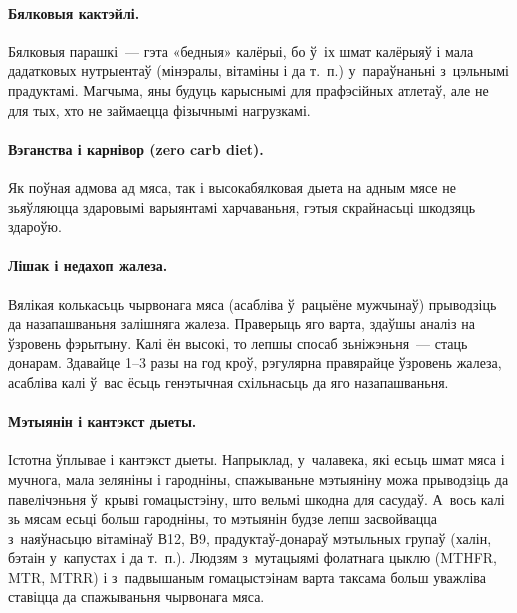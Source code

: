 
\paragraph{Бялковыя кактэйлі.}
Бялковыя парашкі~--- гэта «бедныя» калёрыі, бо ў~іх шмат калёрыяў і мала дадатковых нутрыентаў (мінэралы, вітаміны і да т.~п.) у~параўнаньні з~цэльнымі прадуктамі. Магчыма, яны будуць карыснымі для прафэсійных атлетаў, але не для тых, хто не займаецца фізычнымі нагрузкамі.

\paragraph{Вэганства і карнівор (zero carb diet).}
Як поўная адмова ад мяса, так і высокабялковая дыета на адным мясе не зьяўляюцца здаровымі варыянтамі харчаваньня, гэтыя скрайнасьці шкодзяць здароўю.

\paragraph{Лішак і недахоп жалеза.}
Вялікая колькасьць чырвонага мяса (асабліва ў~рацыёне мужчынаў) прыводзіць да назапашваньня залішняга жалеза. Праверыць яго варта, здаўшы аналіз на ўзровень фэрытыну. Калі ён высокі, то лепшы спосаб зьніжэньня~--- стаць донарам. Здавайце 1--3 разы на год кроў, рэгулярна правярайце ўзровень жалеза, асабліва калі ў~вас ёсьць генэтычная схільнасьць да яго назапашваньня.

\paragraph{Мэтыянін і кантэкст дыеты.}
Істотна ўплывае і кантэкст дыеты. Напрыклад, у~чалавека, які есьць шмат мяса і мучнога, мала зеляніны і гародніны, спажываньне мэтыяніну можа прыводзіць да павелічэньня ў~крыві гомацыстэіну, што вельмі шкодна для сасудаў. А~вось калі зь мясам есьці больш гародніны, то мэтыянін будзе лепш засвойвацца з~наяўнасьцю вітамінаў В12, В9, прадуктаў-донараў мэтыльных групаў (халін, бэтаін у~капустах і да т.~п.). Людзям з~мутацыямі фолатнага цыклю (MTHFR, MTR, MTRR) і з~падвышаным гомацыстэінам варта таксама больш уважліва ставіцца да спажываньня чырвонага мяса.

